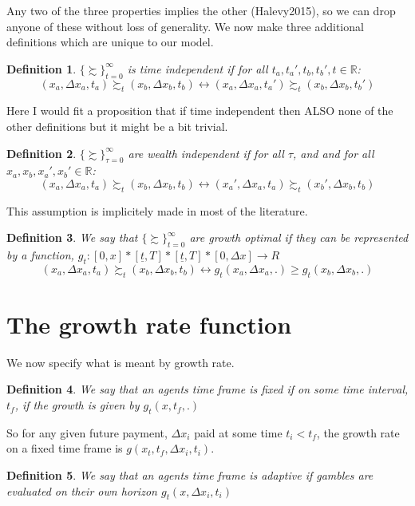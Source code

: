 \documentclass[11pt]{article}
\newtheorem{definition}{Definition}
\numberwithin{equation}{section}
\begin{document}
Any two of the three properties implies the other (Halevy2015), so we can drop anyone of these without loss of generality. We now make three additional definitions which are unique to our model. 

\begin{definition}
$\{ \succsim \}^{\infty}_{t=0}$ is time independent if for all $t_a,t_a',t_b,t_b', t \in \mathbb{R}$: 
\begin{equation}
(x_a,\Delta x_a, t_a) \succsim_{t} (x_b,\Delta x_b, t_b) \leftrightarrow (x_a,\Delta x_a, t_a' ) \succsim_t (x_b,\Delta x_b, t_b')
\end{equation}
\end{definition}

Here I would fit a proposition that if time independent then ALSO none of the other definitions but it might be a bit trivial. 

\begin{definition}
$\{ \succsim \}^{\infty}_{\tau =0}$ are \textit{wealth independent} if for all $\tau$, and and for all $x_a,x_b,x_a',x_b'  \in \mathbb{R}$:
\begin{equation}
(x_a,\Delta x_a, t_a) \succsim_{t} (x_b,\Delta x_b, t_b) \leftrightarrow (x_a',\Delta x_a, t_a) \succsim_{t} (x_b',\Delta x_b, t_b)
\end{equation}
\end{definition}

This assumption is implicitely made in most of the literature.
\begin{definition}
We say that $\{ \succsim \}^{\infty}_{t=0}$ are growth optimal if they can be represented by a function, $g_t: [0,x] * [\underline{t}, T]*[\underline{t}, T]*[0, \Delta x] \rightarrow R$
\begin{equation}
(x_a,\Delta x_a, t_a) \succsim_t (x_b,\Delta x_b, t_b) \leftrightarrow g_t(x_a,\Delta x_a, .) \geq g_t(x_b,\Delta x_b, .)
\end{equation}
\end{definition}

\section{The growth rate function}

We now specify what is meant by growth rate.
\begin{definition}
We say that an agents time frame is fixed if on some time interval, $t_f$, if the growth is given by $g_t(x,t_f,.)$
\end{definition}
So for any given future payment, $\Delta x_i$ paid at some time $t_i<t_f$, the growth rate on a fixed time frame is $g(x_t,t_f,\Delta x_i, t_i)$.
\begin{definition}
We say that an agents time frame is adaptive if gambles are evaluated on their own horizon $g_t(x,\Delta x_i, t_i)$
\end{definition}
\end{document}
